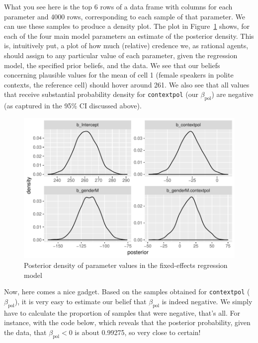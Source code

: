 \documentclass[nobib]{tufte-handout}
\begin{document}
What you see here is the top 6 rows of a data frame with columns for each parameter and 4000 rows, corresponding to each sample of that parameter.
%
%
We can use these samples to produce a density plot. The plot in Figure~\ref{fig:Posteriors_FE} shows, for each of the four main model parameters an estimate of the posterior density. This is, intuitively put, a plot of how much (relative) credence we, as rational agents, should assign to any particular value of each parameter, given the regression model, the specified prior beliefs, and the data. We see that our beliefs concerning plausible values for the mean of cell 1 (female speakers in polite contexts, the reference cell) should hover around 261. We also see that all values that receive substantial probability density for \texttt{contextpol} (our $\beta_{\text{pol}}$) are negative (as captured in the 95\% CI discussed above). 

\begin{figure}
  \centering
  \includegraphics[width=\textwidth]{pics/posterior_density_FE.pdf}
  \caption[Posteriors fixed-effects model]{Posterior density of parameter values in the fixed-effects regression model}
  \label{fig:Posteriors_FE}
\end{figure}

Now, here comes a nice gadget. Based on the samples obtained for \texttt{contextpol} ($\beta_{\text{pol}}$), it is very easy to estimate our belief that $\beta_{\text{pol}}$ is indeed negative. We simply have to calculate the proportion of samples that were negative, that's all. For instance, with the code below, which reveals that the posterior probability, given the data, that $\beta_{\text{pol}} < 0$ is about 0.99275, so very close to certain!  
\end{document}
